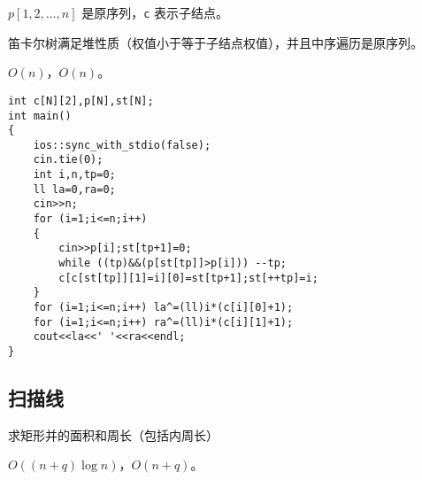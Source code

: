 \documentclass[12pt]{ctexart}
\begin{document}
$p[1,2,\ldots,n]$ 是原序列，\verb|c| 表示子结点。

笛卡尔树满足堆性质（权值小于等于子结点权值），并且中序遍历是原序列。

$O(n)$，$O(n)$。

\begin{lstlisting}
int c[N][2],p[N],st[N];
int main()
{
	ios::sync_with_stdio(false);
	cin.tie(0);
	int i,n,tp=0;
	ll la=0,ra=0;
	cin>>n;
	for (i=1;i<=n;i++)
	{
		cin>>p[i];st[tp+1]=0;
		while ((tp)&&(p[st[tp]]>p[i])) --tp;
		c[c[st[tp]][1]=i][0]=st[tp+1];st[++tp]=i;
	}
	for (i=1;i<=n;i++) la^=(ll)i*(c[i][0]+1);
	for (i=1;i<=n;i++) ra^=(ll)i*(c[i][1]+1);
	cout<<la<<' '<<ra<<endl;
}
\end{lstlisting}

\subsection{扫描线}

求矩形并的面积和周长（包括内周长）

$O((n+q)\log n)$，$O(n+q)$。
\end{document}
